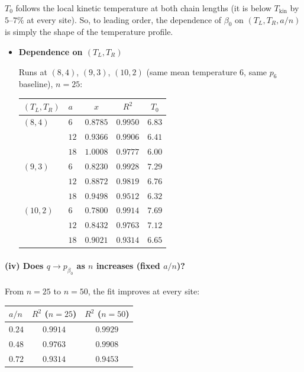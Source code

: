 \documentclass[11pt]{article}
\begin{document}
$T_0$ follows the local kinetic temperature at both chain lengths
(it is below $T_{\mathrm{kin}}$ by $5$--$7\%$ at every site). So, to leading
order, the dependence of $\beta_0$ on $(T_L, T_R, a/n)$ is simply the shape
of the temperature profile.


\begin{itemize}
    \item \textbf{Dependence on $(T_L, T_R)$}

Runs at $(8,4)$, $(9,3)$, $(10,2)$
(same mean temperature $6$, same $p_6$ baseline), $n=25$:
\begin{center}
\begin{tabular}{llccc}
\toprule
$(T_L,T_R)$ & $a$ & $x$ & $R^2$ & $T_0$ \\
\midrule
$(8,4)$  & $6$  & $0.8785$ & $0.9950$ & $6.83$ \\
         & $12$ & $0.9366$ & $0.9906$ & $6.41$ \\
         & $18$ & $1.0008$ & $0.9777$ & $6.00$ \\
$(9,3)$  & $6$  & $0.8230$ & $0.9928$ & $7.29$ \\
         & $12$ & $0.8872$ & $0.9819$ & $6.76$ \\
         & $18$ & $0.9498$ & $0.9512$ & $6.32$ \\
$(10,2)$ & $6$  & $0.7800$ & $0.9914$ & $7.69$ \\
         & $12$ & $0.8432$ & $0.9763$ & $7.12$ \\
         & $18$ & $0.9021$ & $0.9314$ & $6.65$ \\
\bottomrule
\end{tabular}
\end{center}
    
\end{itemize}





\paragraph{(iv) Does $q \to p_{\beta_0}$ as $n$ increases (fixed $a/n$)?}

From $n=25$ to $n=50$, the fit improves at every site:
\begin{center}
\begin{tabular}{lcc}
\toprule
$a/n$ & $R^2$ ($n=25$) & $R^2$ ($n=50$) \\
\midrule
$0.24$ & $0.9914$ & $0.9929$ \\
$0.48$ & $0.9763$ & $0.9908$ \\
$0.72$ & $0.9314$ & $0.9453$ \\
\bottomrule
\end{tabular}
\end{center}
\end{document}
